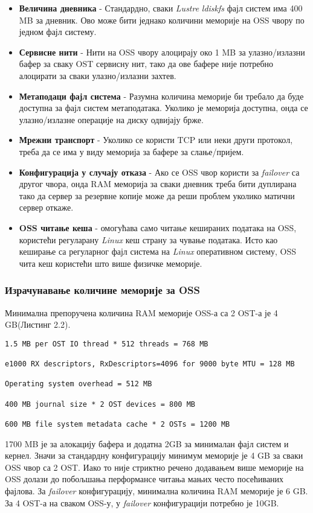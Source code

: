 
\begin{itemize}
\item \textbf{Величина дневника} - Стандардно, сваки   \textit{Lustre} \textit{ldiskfs} фајл систем има 400 MB за дневник. Ово може бити једнако количини меморије на  OSS чвору по једном фајл систему.

\item \textbf{Сервисне нити} - Нити на OSS чвору алоцирају око 1 MB за улазно/излазни бафер за сваку OST сервисну нит, тако да ове бафере није потребно алоцирати за сваки улазно/излазни захтев.

\item \textbf{Метаподаци фајл система} - Разумна количина меморије би требало да буде доступна за фајл систем метаподатака. Уколико је меморија доступна, онда се улазно/излазне операције на диску одвијају брже.

\item \textbf{Мрежни транспорт} - Уколико се користи  TCP или неки други протокол, треба да се има у виду меморија за бафере за слање/пријем.

\item \textbf{Конфигурација у случају отказа} - Ако се OSS чвор користи за \textit{failover} са другог чвора, онда RAM меморија за сваки дневник треба бити дуплирана тако да сервер за резервне копије може да реши проблем уколико матични сервер откаже.

\item \textbf{OSS читање кеша} - омогућава само читање кешираних података на OSS, користећи регуларану \textit{Linux} кеш страну за чување података. Исто као кеширање са регуларног фајл система на \textit{Linux} оперативном систему, OSS чита кеш користећи што више физичке меморије.
\end{itemize}

\subsubsection{Израчунавање количине меморије за  OSS }

Минимална препоручена количина RAM меморије OSS-а са 2 OST-а је 4 GB(Листинг 2.2).


\begin{lstlisting}[style=nonumbers,frame=single, caption=Препоручена количина RAM меморије]
1.5 MB per OST IO thread * 512 threads = 768 MB

e1000 RX descriptors, RxDescriptors=4096 for 9000 byte MTU = 128 MB

Operating system overhead = 512 MB

400 MB journal size * 2 OST devices = 800 MB

600 MB file system metadata cache * 2 OSTs = 1200 MB
\end{lstlisting}

1700 MB је за алокацију бафера и додатна 2GB за минималан фајл систем и кернел. Значи за стандардну конфигурацију минимум  меморије је 4 GB за сваки OSS чвор са 2 OST. Иако то није стриктно речено додавањем више меморије на OSS долази до побољшања перформансе читања мањих често посећиваних фајлова. 
За \textit{failover} конфигурацију, минимална количина RAM меморије је 6 GB. За 4 OST-а на сваком OSS-у, у \textit{failover} конфигурацији потребно је 10GB.
